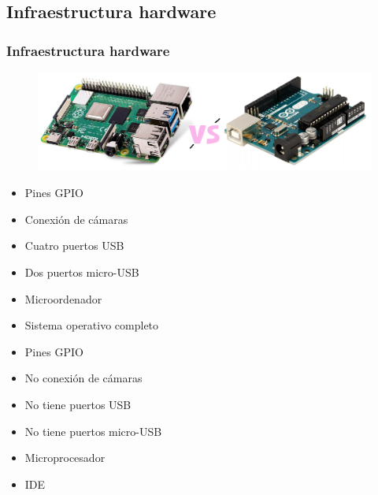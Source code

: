 \documentclass{beamer}
\begin{document}
\subsection{Infraestructura hardware}
\begin{frame}
\frametitle{Infraestructura hardware}
\begin{figure}
\centering
\includegraphics[width=12cm]{figs/VS}
\end{figure}
\begin{multicols}{2}

\begin{itemize}
\centering
\item[] Pines GPIO
\item[] Conexión de cámaras
\item[] Cuatro puertos USB
\item[] Dos puertos micro-USB
\item[] Microordenador
\item[] Sistema operativo completo
\item[] Pines GPIO
\item[] No conexión de cámaras
\item[] No tiene puertos USB
\item[] No tiene puertos micro-USB
\item[] Microprocesador
\item[] IDE
\end{itemize}

\end{multicols}
\end{frame}
\end{document}
